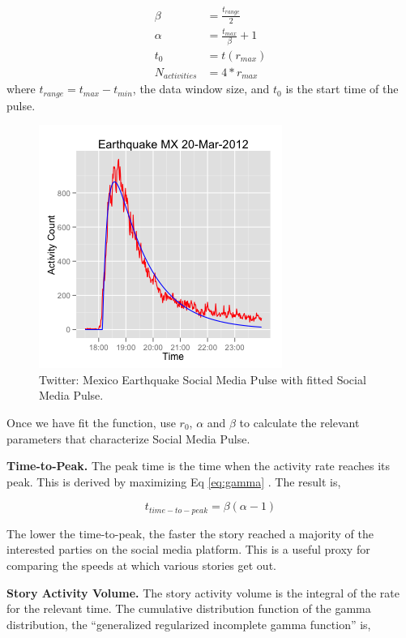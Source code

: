 \documentclass{article}
\begin{document}
\begin{eqnarray}\label{eq:guess}
\beta & = \frac{t_{range}}{2}\\
\alpha & = \frac{t_{max}}{\beta} + 1\\
t_0 & = t(r_{max})\\
N_{activities} & = 4*r_{max}
\end{eqnarray}
where $t_{range} = t_{max} - t_{min}$, the data window size, and $t_0$ is the start time of the pulse.

\begin{figure}[ht]
\includegraphics[width=2.8 in]{img/twitterPulse_fits_limit.png}
\caption{Twitter: Mexico Earthquake Social Media Pulse with fitted Social Media Pulse.}
\label{fig:TwitterLimitedFit}
\end{figure}

Once we have fit the function, use $r_0$, $\alpha$ and $\beta$ to calculate the relevant parameters that characterize Social Media Pulse.

\textbf{Time-to-Peak.}  The peak time is the time when the activity rate reaches its peak.  This is derived by maximizing Eq \ref{eq:gamma} . The result is,

\begin{equation}
t_{time-to-peak} = \beta (\alpha - 1)
\label{eq:peak}
\end{equation}

The lower the time-to-peak, the faster the story reached a majority of the interested parties on the social media platform. This is a useful proxy for comparing the speeds at which various stories get out.

\textbf{Story Activity Volume.}  The story activity volume is the integral of the rate for the relevant time.  The cumulative distribution function of the gamma distribution, the ``generalized regularized incomplete gamma function'' is,
\end{document}
